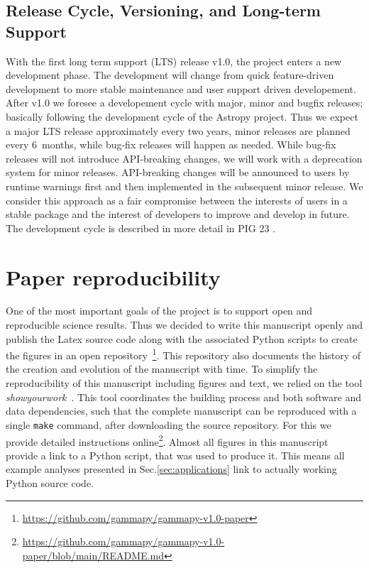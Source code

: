 \documentclass[longauth]{aa}
\newcommand{\code}[1]{\texttt{#1}}
\begin{document}
\subsection{Release Cycle, Versioning, and Long-term Support}
\label{ssec:release-cycle}
With the first long term support (LTS) release v1.0, the \gammapy project
enters a new development phase. The development will change from
quick feature-driven development to more stable maintenance
and user support driven developement. After v1.0 we foresee
a developement cycle with major, minor and bugfix releases;
basically following the development cycle of the Astropy
project. Thus we expect a major LTS release approximately
every two years, minor releases are planned every 6~months,
while bug-fix releases will happen as needed. While
bug-fix releases will not introduce API-breaking changes,
we will work with a deprecation system for minor releases.
API-breaking changes will be announced to users by runtime
warnings first and then implemented in the subsequent
minor release. We consider this approach as a fair
compromise between the interests of users in a stable
package and the interest of developers to improve
and develop \gammapy in future. The development cycle is described
in more detail in PIG 23 \citep{gammapy_pig_23}.

\section{Paper reproducibility}
\label{sec:reproducibility}
One of the most important goals of the \gammapy project is to support open and
reproducible science results. Thus we decided to write this manuscript
openly and publish the Latex source code along with the associated
Python scripts to create the figures
in an open repository~\footnote{\url{https://github.com/gammapy/gammapy-v1.0-paper}}.
This \github repository also documents the history of the creation
and evolution of the manuscript with time. To simplify the reproducibility
of this manuscript including figures and text, we relied on the tool
\textit{showyourwork}~\citep{Luger2021}. This tool coordinates the building
process and both software and data dependencies, such that the complete
manuscript can be reproduced with a single \code{make} command, after
downloading the source repository. For this we provide
detailed instructions online\footnote{\url{https://github.com/gammapy/gammapy-v1.0-paper/blob/main/README.md}}.
Almost all figures in this manuscript provide a link
to a Python script, that was used to produce it. This means all
example analyses presented in Sec.\ref{sec:applications} link to
actually working Python source code.
\end{document}
